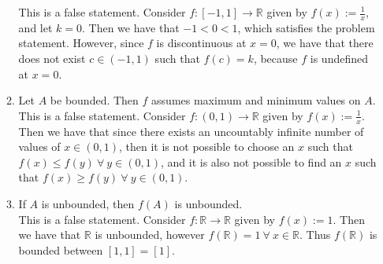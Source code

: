 \documentclass[12pt,letterpaper]{article}
\newcommand{\R}{\mathbb{R}}
\theoremstyle{case}
\theoremstyle{definition}
\begin{document}
\begin{enumerate}
\begin{enumerate}
				This is a false statement. Consider $f:[-1,1] \to \R$ given by $f(x):=\frac{1}{x}$, and let $k=0$. Then we have that $-1 < 0 < 1$, which satisfies the problem statement. However, since $f$ is discontinuous at $x=0$, we have that there does not exist $c \in (-1,1)$ such that $f(c)=k$, because $f$ is undefined at $x=0$.\\
				\item Let $A$ be bounded. Then $f$ assumes maximum and minimum values on $A$.\\
				
				This is a false statement. Consider $f:(0,1) \to \R$ given by $f(x):=\frac{1}{x}$. Then we have that since there exists an uncountably infinite number of values of $x \in (0,1)$, then it is not possible to choose an $x$ such that $f(x) \leq f(y)\ \forall\ y \in (0,1)$, and it is also not possible to find an $x$ such that $f(x) \geq f(y)\ \forall\ y \in (0,1)$.\\
				\item If $A$ is unbounded, then $f(A)$ is unbounded.\\
				
				This is a false statement. Consider $f:\R \to \R$ given by $f(x):=1$. Then we have that $\R$ is unbounded, however $f(\R)=1\ \forall\ x \in \R$. Thus $f(\R)$ is bounded between $[1,1]=[1]$.
			\end{enumerate}
	\end{enumerate}
\end{document}
